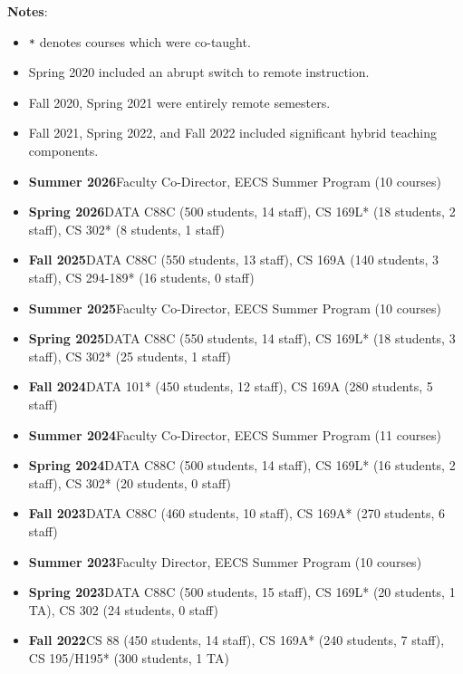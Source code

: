 \textbf{Notes}:
\begin{itemize}
    \item \texttt{*} denotes courses which were co-taught.
    \item Spring 2020 included an abrupt switch to remote instruction.
    \item Fall 2020, Spring 2021 were entirely remote semesters.
    \item Fall 2021, Spring 2022, and Fall 2022 included significant hybrid teaching components.
\end{itemize}

\newcommand{\semester}[2]{\item{\textbf{#1}\newline}#2}

\begin{itemize}
    \setlength\itemsep{0.7em}

    \semester{Summer 2026}{Faculty Co-Director, EECS Summer Program (10 courses)}

    \semester{Spring 2026} {DATA C88C (500 students, 14 staff), CS 169L* (18 students, 2 staff), CS 302* (8 students, 1 staff)}

    \semester{Fall 2025}{DATA C88C (550 students, 13 staff), CS 169A (140 students, 3 staff), CS 294-189* (16 students, 0 staff)}

    \semester{Summer 2025}{Faculty Co-Director, EECS Summer Program (10 courses)}

    \semester{Spring 2025} {DATA C88C (550 students, 14 staff), CS 169L* (18 students, 3 staff), CS 302* (25 students, 1 staff)}

    \semester{Fall 2024}{DATA 101* (450 students, 12 staff), CS 169A (280 students, 5 staff)}

    \semester{Summer 2024}{Faculty Co-Director, EECS Summer Program (11 courses)}
    
    \semester{Spring 2024} {DATA C88C (500 students, 14 staff), CS 169L* (16 students, 2 staff), CS 302* (20 students, 0 staff)}
    
    \semester{Fall 2023} {DATA C88C (460 students, 10 staff), CS 169A* (270 students, 6 staff)}

    \semester{Summer 2023}{Faculty Director, EECS Summer Program (10 courses)}

    \semester{Spring 2023} {DATA C88C (500 students, 15 staff), CS 169L* (20 students, 1 TA), CS 302 (24 students, 0 staff)}
    
    \semester{Fall 2022}{CS 88 (450 students, 14 staff), CS 169A* (240 students, 7 staff), CS 195/H195* (300 students, 1 TA)} 


\end{itemize}
